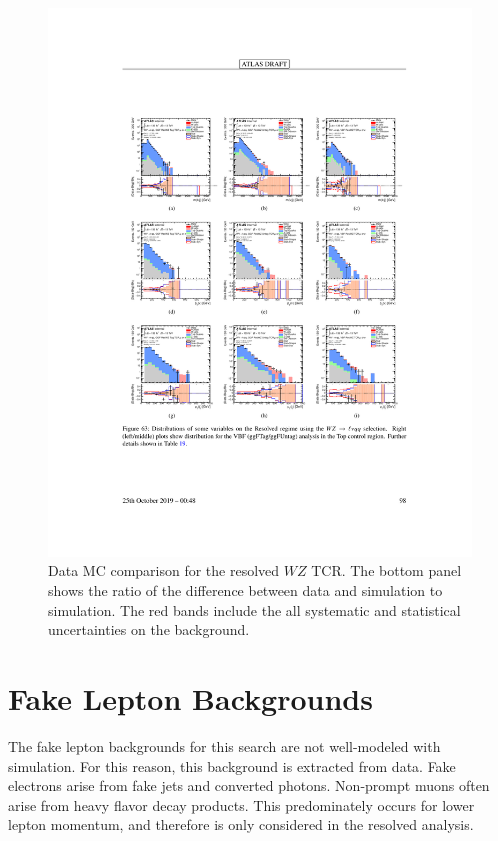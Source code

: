 \begin{figure}[htbp]
  \centering
  \includegraphics{figures/Analysis/datamc/resolved_wz_tcr.pdf}
      \caption{Data MC comparison for the resolved $WZ$ TCR. The bottom panel shows the ratio of the difference between data and simulation to simulation. The red bands include the all systematic and statistical uncertainties on the background. } 
  \label{fig:resolved_wz_TCR_datamc}
\end{figure} 
\FloatBarrier
\section{Fake Lepton Backgrounds}
\label{fakelep}
The fake lepton backgrounds for this search are not well-modeled with simulation. For this reason, this background is extracted from data. Fake electrons arise from fake jets and converted photons. Non-prompt muons often arise from heavy flavor decay products. This predominately occurs for lower lepton momentum, and therefore is only considered in the resolved analysis.

